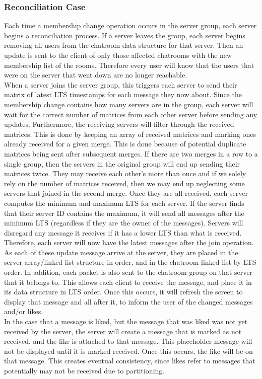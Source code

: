 \documentclass[12pt,journal,compsoc]{IEEEtran}
\begin{document}
\subsubsection{Reconciliation Case}
Each time a membership change operation occurs in the server group, each
server begins a reconciliation process.  If a server leaves the group, each
server begins removing all users from the chatroom data structure for that
server.  Then an update is sent to the client of only those affected
chatrooms with the new membership list of the rooms.  Therefore every user
will know that the users that were on the server that went down are no
longer reachable.  \\When a server joins the server group, this triggers
each server to send their matrix of latest LTS timestamps for each message
they now about.  Since the membership change contains how many servers are
in the group, each server will wait for the correct number of matrices from
each other server before sending any updates. Furthermore, the receiving
servers will filter through the received matrices. This is done by keeping
an array of received matrices and marking ones already received for a given
merge.  This is done because of potential duplicate matrices being sent
after subsequent merges. If there are two merges in a row to a single
group, then the servers in the original group will end up sending their
matrices twice. They may receive each other's more than once and if we
solely rely on the number of matrices received, then we may end up
neglecting some servers that joined in the second merge.  Once they are all received, each server computes the minimum and maximum LTS for each server.  If the server finds that their server ID contains the maximum, it will send all messages after the minimum LTS (regardless if they are the owner of the messages).  Servers will disregard any message it receives if it has a lower LTS than what is received.  Therefore, each server will now have the latest messages after the join operation.  \\
As each of these update message arrive at the server, they are placed in the server array/linked list structure in order, and in the chatroom linked list by LTS order.  In addition, each packet is also sent to the chatroom group on that server that it belongs to.  This allows each client to receive the message, and place it in its data structure in LTS order.  Once this occurs, it will refresh the screen to display that message and all after it, to inform the user of the changed messages and/or likes.\\
In the case that a message is liked, but the message that was liked was not yet received by the server, the server will create a message that is marked as not received, and the like is attached to that message.  This placeholder message will not be displayed until it is marked received.  Once this occurs, the like will be on that message.  This creates eventual consistency, since likes refer to messages that potentially may not be received due to partitioning.
\end{document}
